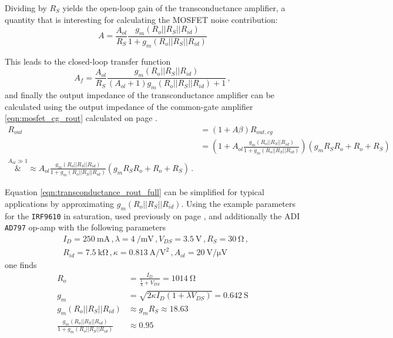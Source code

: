 \documentclass[12pt]{book}
\providecommand{\device}[1]{\texttt{\small #1}}
\begin{document}
Dividing by $R_S$ yields the open-loop gain of the transconductance amplifier, a quantity that is interesting for calculating the MOSFET noise contribution:
\begin{equation}
    A = \frac{A_{ol}}{R_S} \frac{g_m \left(R_o || R_S || R_{id}\right)}{1 + g_m \left(R_o || R_S || R_{id}\right)} \label{eqn:transconductance_amplifier_open_loop_gain}
\end{equation}

This leads to the closed-loop transfer function
\begin{equation}
    A_f = \frac{A_{ol}}{R_S} \frac{g_m \left(R_o || R_S || R_{id}\right)}{(A_{ol}+1)g_m \left(R_o || R_S || R_{id}\right) + 1} \label{eqn:transconductance_amplifier_transfer_function} \,,
\end{equation}
and finally the output impedance of the transconductance amplifier can be calculated using the output impedance of the common-gate amplifier \ref{eqn:mosfet_cg_rout} calculated on page \pageref{eqn:mosfet_cg_rout}.
\begin{align}
    R_{out} &= \left(1+ A\beta\right) R_{out,cg} \nonumber\\
    &= \left(1 + A_{ol} \frac{g_m \left(R_o || R_S || R_{id}\right)}{1 + g_m \left(R_o || R_S || R_{id}\right)} \right) \left(g_m R_S R_o + R_o + R_S \right) \nonumber\\
    \overset{A_{ol} \gg 1}&{\approx} A_{ol} \frac{g_m \left(R_o || R_S || R_{id}\right)}{1 + g_m \left(R_o || R_S || R_{id}\right)} \left(g_m R_S R_o + R_o + R_S \right) \,. \label{eqn:transconductance_rout_full}
\end{align}

Equation \ref{eqn:transconductance_rout_full} can be simplified for typical applications by approximating $g_m \left(R_o || R_S || R_{id}\right)$. Using the example parameters for the \device{IRF9610} in saturation, used previously on page \pageref{eqn:mosfet_rout_irf9610}, and additionally the ADI \device{AD797} \cite{datasheet_AD797} op-amp with the following parameters
\begin{align*}
    &I_D = \qty{250}{\mA} \,, \lambda = \qty[per-mode=power]{4}{\per \milli \volt} \,, V_{DS} = \qty{3.5}{\V}\,, R_S = \qty{30}{\ohm}\,,\\
    &R_{id} = \qty{7.5}{\kilo\ohm}\,, \kappa = \qty[per-mode=power]{0.813}{\ampere \per \square\volt}\,, A_{ol} = \qty[per-mode=power]{20}{\volt \per \uV}
\end{align*}
one finds
\begin{align*}
    R_{o} &= \frac{I_D}{\frac{1}{\lambda} + V_{DS}} = \qty{1014}{\ohm}\\
    g_m &= \sqrt{2 \kappa I_D \left(1+ \lambda V_{DS}\right)} = \qty{0.642}{\siemens}\\
    g_m \left(R_o || R_S || R_{id}\right) &\approx g_m R_S \approx \num{18.63}\\
    \frac{g_m \left(R_o || R_S || R_{id}\right)}{1 + g_m \left(R_o || R_S || R_{id}\right)} &\approx \num{0.95}
\end{align*}
\end{document}
